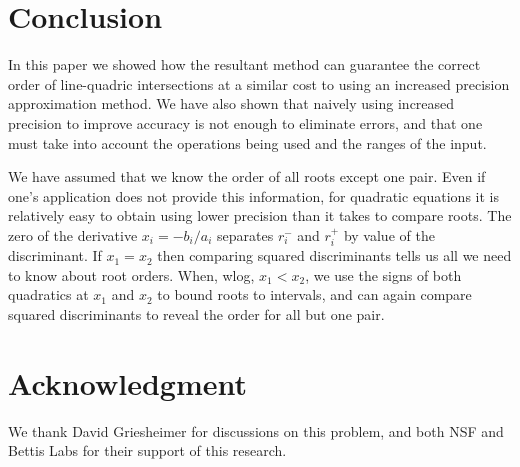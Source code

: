 \documentclass{cccg16}
\begin{document}
\section{Conclusion}
In this paper we showed how the resultant method can guarantee the
correct order of line-quadric intersections at a similar cost to using
an increased precision approximation method.  We have also shown that
naively using increased precision to improve accuracy is not enough to
eliminate errors, and that one must take into account the operations
being used and the ranges of the input.

We have assumed that we know the order of all roots except one
pair. Even if one's application does not provide this information, for
quadratic equations it is relatively easy to obtain using lower
precision than it takes to compare roots.  The zero of the derivative
$x_i=-b_i/a_i$ separates $r_i^-$ and $r_i^+$ by value of the
discriminant.  If $x_1=x_2$ then comparing squared discriminants tells
us all we need to know about root orders.  When, wlog, $x_1<x_2$, we
use the signs of both quadratics at $x_1$ and $x_2$ to bound roots to
intervals, and can again compare squared discriminants to reveal the
order for all but one pair.

\section{Acknowledgment}
We thank David Griesheimer for discussions on this problem, and both
NSF and Bettis Labs for their support of this research.



\end{document}
